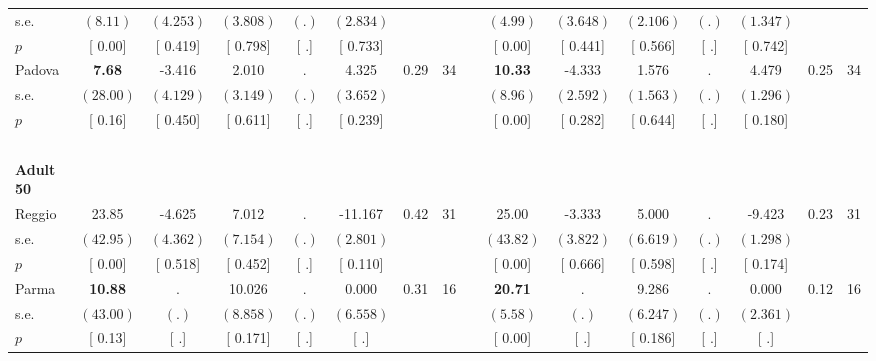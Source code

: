 \begin{longtable}{L{8em} c c c c c c c p{1em} c c c c c c c}
\quad \quad \quad \quad s.e.& $ (     8.11)$ & $ (    4.253)$ & $ (    3.808)$ & $ (        .)$ & $ (    2.834)$ & & & & $ (     4.99)$ & $ (    3.648)$ & $ (    2.106)$ & $ (        .)$ & $ (    1.347)$ & &  \\*
\quad \quad \quad \quad $ p$ & [     0.00] & [    0.419] & [    0.798] & [        .] & [    0.733] & & & & [     0.00] & [    0.441] & [    0.566] & [        .] & [    0.742] & &  \\[1em]
\quad \quad \quad Padova& \textbf{     7.68} &    -3.416 &     2.010 &         . &     4.325 &      0.29 &        34 & & \textbf{    10.33} &    -4.333 &     1.576 &         . &     4.479 &      0.25 &        34  \\*
\quad \quad \quad \quad s.e.& $ (    28.00)$ & $ (    4.129)$ & $ (    3.149)$ & $ (        .)$ & $ (    3.652)$ & & & & $ (     8.96)$ & $ (    2.592)$ & $ (    1.563)$ & $ (        .)$ & $ (    1.296)$ & &  \\*
\quad \quad \quad \quad $ p$ & [     0.16] & [    0.450] & [    0.611] & [        .] & [    0.239] & & & & [     0.00] & [    0.282] & [    0.644] & [        .] & [    0.180] & &  \\[1em]
~\\[1em]
\quad \quad \textbf{Adult 50} & & & & & & & & & & & & & & & \\* 
\quad \quad \quad Reggio& 23.85 &    -4.625 &     7.012 &         . &   -11.167 &      0.42 &        31 & & 25.00 &    -3.333 &     5.000 &         . &    -9.423 &      0.23 &        31  \\*
\quad \quad \quad \quad s.e.& $ (    42.95)$ & $ (    4.362)$ & $ (    7.154)$ & $ (        .)$ & $ (    2.801)$ & & & & $ (    43.82)$ & $ (    3.822)$ & $ (    6.619)$ & $ (        .)$ & $ (    1.298)$ & &  \\*
\quad \quad \quad \quad $ p$ & [     0.00] & [    0.518] & [    0.452] & [        .] & [    0.110] & & & & [     0.00] & [    0.666] & [    0.598] & [        .] & [    0.174] & &  \\[1em]
\quad \quad \quad Parma& \textbf{    10.88} &         . &    10.026 &         . &     0.000 &      0.31 &        16 & & \textbf{    20.71} &         . &     9.286 &         . &     0.000 &      0.12 &        16  \\*
\quad \quad \quad \quad s.e.& $ (    43.00)$ & $ (        .)$ & $ (    8.858)$ & $ (        .)$ & $ (    6.558)$ & & & & $ (     5.58)$ & $ (        .)$ & $ (    6.247)$ & $ (        .)$ & $ (    2.361)$ & &  \\*
\quad \quad \quad \quad $ p$ & [     0.13] & [        .] & [    0.171] & [        .] & [        .] & & & & [     0.00] & [        .] & [    0.186] & [        .] & [        .] & &  \\[1em]

\end{longtable}
